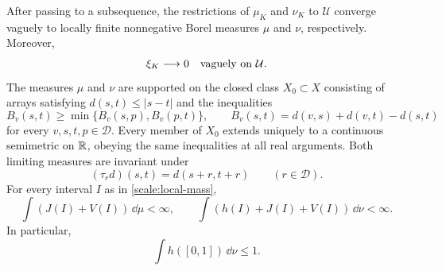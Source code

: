 \begin{proposition}\label{scale:limits}
After passing to a subsequence, the restrictions of $\mu_K$ and
$\nu_K$ to $\mathcal U$ converge vaguely to locally finite
nonnegative Borel measures $\mu$ and $\nu$, respectively. Moreover,
\begin{equation}\label{scale:initial-negligible}
 \xi_K\longrightarrow0\quad\hbox{vaguely on }\mathcal U.
\end{equation}
The measures $\mu$ and $\nu$ are supported on the closed class
$X_0\subset X$ consisting of arrays satisfying $d(s,t)\le|s-t|$
and the inequalities
\begin{equation}\label{scale:tree-inequality}
 B_v(s,t)\ge\min\{B_v(s,p),B_v(p,t)\},\qquad
 B_v(s,t)=d(v,s)+d(v,t)-d(s,t)
\end{equation}
for every $v,s,t,p\in\mathcal D$. Every member of $X_0$ extends
uniquely to a continuous semimetric on $\mathbb{R}$, obeying the same
inequalities at all real arguments. Both limiting measures are
invariant under
\[
 (\tau_r d)(s,t)=d(s+r,t+r)\qquad(r\in\mathcal D).
\]
For every interval $I$ as in \cref{scale:local-mass},
\begin{equation}\label{scale:limiting-test-bound}
 \int(J(I)+V(I))\,\dd\mu<\infty,
 \qquad
 \int(h(I)+J(I)+V(I))\,\dd\nu<\infty.
\end{equation}
In particular,
\begin{equation}\label{scale:terminal-shortfall}
 \int h([0,1])\,\dd\nu\le1.
\end{equation}
\end{proposition}

